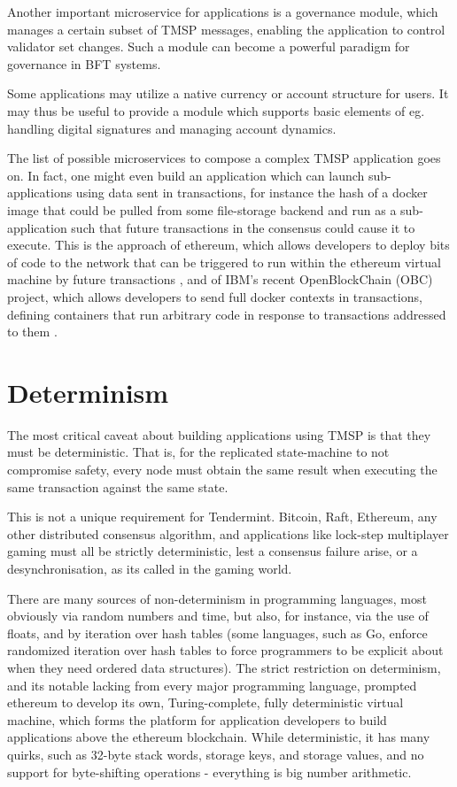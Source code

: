 Another important microservice for applications is a governance module, 
which manages a certain subset of TMSP messages, enabling the application to control validator set changes.
Such a module can become a powerful paradigm for governance in BFT systems.

Some applications may utilize a native currency or account structure for users.
It may thus be useful to provide a module which supports basic elements of eg. handling digital signatures and managing account dynamics.

The list of possible microservices to compose a complex TMSP application goes on. 
In fact, one might even build an application which can launch sub-applications using data sent in transactions,
for instance the hash of a docker image that could be pulled from some file-storage backend and run as a sub-application such that 
future transactions in the consensus could cause it to execute. 
This is the approach of ethereum, 
which allows developers to deploy bits of code to the network that can be triggered to run within the ethereum virtual machine by future transactions \cite{ethereum},
and of IBM's recent OpenBlockChain (OBC) project, which allows developers to send full docker contexts in transactions, 
defining containers that run arbitrary code in response to transactions addressed to them \cite{obc}.

\section{Determinism}

The most critical caveat about building applications using TMSP is that they must be deterministic.
That is, for the replicated state-machine to not compromise safety, 
every node must obtain the same result when executing the same transaction against the same state.

This is not a unique requirement for Tendermint. Bitcoin, Raft, Ethereum, any other distributed consensus algorithm,
and applications like lock-step multiplayer gaming must all be strictly deterministic, lest a consensus failure arise,
or a desynchronisation, as its called in the gaming world.

There are many sources of non-determinism in programming languages, most obviously via random numbers and time,
but also, for instance, via the use of floats, and by iteration over hash tables 
(some languages, such as Go, enforce randomized iteration over hash tables to force programmers to be explicit about when they need ordered data structures).
The strict restriction on determinism, and its notable lacking from every major programming language,
prompted ethereum to develop its own, Turing-complete, fully deterministic virtual machine,
which forms the platform for application developers to build applications above the ethereum blockchain.
While deterministic, it has many quirks, such as 32-byte stack words, storage keys, and storage values,
and no support for byte-shifting operations - everything is big number arithmetic.

